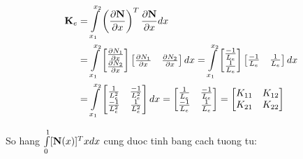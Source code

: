 \begin{equation}\label{eq_Ke}
    \begin{aligned}
        {\bf K}_e &= \int\limits_{x_1}^{x_2}\left(\frac{\partial{\bf N}}{\partial x}\right)^T\frac{\partial{\bf N}}{\partial x} dx \\
        & =\int\limits_{x_1}^{x_2}\begin{bmatrix}
            \frac{\partial N_1}{\partial x} \\ \frac{\partial N_2}{\partial x}
        \end{bmatrix}\begin{bmatrix}
            \frac{\partial N_1}{\partial x} &\frac{\partial N_2}{\partial x}
        \end{bmatrix}dx = \int\limits_{x_1}^{x_2}\begin{bmatrix}
            \frac{-1}{L_e} \\ \frac{1}{L_e}
        \end{bmatrix}\begin{bmatrix}
            \frac{-1}{L_e}& \frac{1}{L_e}
        \end{bmatrix}dx \\
        &= \int\limits_{x_1}^{x_2}\begin{bmatrix}
            \frac{1}{L_e^2} & \frac{-1}{L_e^2} \\
            \frac{-1}{L_e^2} & \frac{1}{L_e^2}
        \end{bmatrix}dx = \begin{bmatrix}
            \frac{1}{L_e} & \frac{-1}{L_e} \\
            \frac{-1}{L_e} & \frac{1}{L_e}
        \end{bmatrix} = \begin{bmatrix}
            K_{11} & K_{12} \\
            K_{21} & K_{22}
        \end{bmatrix}
    \end{aligned}
\end{equation}

So hang $ \int\limits_0^1 [{\bf N}(x)]^Tx dx$ cung duoc tinh bang cach tuong tu:

